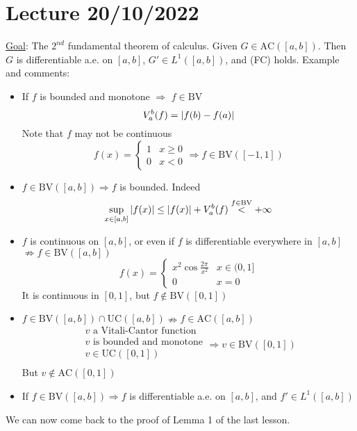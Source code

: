 \section{Lecture 20/10/2022}
\underline{Goal}: The \(2^{nd}\) fundamental theorem of calculus. Given \(G \in \mbox{AC}([a,b])\). Then \(G\) is differentiable a.e. on \([a,b]\), \(G' \in L^1([a,b])\), and (FC) holds.
Example and comments:
\begin{itemize}
    \item If \(f\) is bounded and monotone \(\Rightarrow\) \(f \in \mbox{BV}\)
    \[
        V_a^b (f) = \abs{f(b) - f(a)}
    \]
    Note that \(f\) may not be continuous
    \[
        f(x) = \begin{cases}
            1 & x \geq 0 \\
            0 & x < 0
        \end{cases}
        \Rightarrow f \in \mbox{BV}([-1,1])
    \]
    \item \(f \in \mbox{BV}([a,b]) \Rightarrow f\) is bounded. Indeed
    \[
        \sup_{x \in [a,b]} \abs{f(x)} \leq \abs{f(x)} + V_a^b(f) \overset{f \in \text{BV}}{<} +\infty
    \]
    \item \(f\) is continuous on \([a,b]\), or even if  \(f\) is differentiable everywhere in \([a,b]\) \(\nRightarrow f \in \mbox{BV}([a,b])\)
    \[
        f(x) = \begin{cases}
            x^2\cos{\frac{2\pi}{x^2}} & x \in (0,1] \\
            0 & x = 0
        \end{cases}
    \]
    It is continuous in \([0,1]\), but \(f \notin \mbox{BV}([0,1])\)
    \item \(f \in \mbox{BV}([a,b]) \cap \mbox{UC}([a,b])  \nRightarrow f \in \mbox{AC}([a,b])\)
    \[\begin{array}{l}
        v \mbox{ a Vitali-Cantor function} \\ v \mbox{ is bounded and monotone} \\ 
        v \in \mbox{UC}([0,1]) \\ 
        
    \end{array}
    \Rightarrow v \in \mbox{BV}([0,1]) 
    \]
    But \(v \not \in \mbox{AC}([0,1])\)
    \item If \(f \in \mbox{BV}([a,b]) \Rightarrow f\) is differentiable a.e. on \([a,b]\), and \(f' \in L^1([a,b])\)
\end{itemize}
We can now come back to the proof of Lemma 1 of the last lesson.


